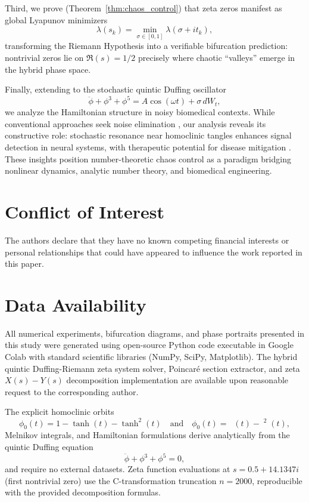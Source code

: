 \documentclass{ws-ijbc}
\DeclareMathOperator{\RZsech}{sech_{RZ}}
\begin{document}
Third, we prove (Theorem~\ref{thm:chaos_control}) that zeta zeros manifest as global Lyapunov minimizers
\[
\lambda(s_k)=\min_{\sigma\in[0,1]}\lambda(\sigma+it_k),
\]
transforming the Riemann Hypothesis into a verifiable bifurcation prediction: nontrivial zeros lie on $\Re(s)=1/2$ precisely where chaotic ``valleys'' emerge in the hybrid phase space.

Finally, extending to the stochastic quintic Duffing oscillator
\[
\ddot{\phi}+\phi^3+\phi^5=A\cos(\omega t)+\sigma\, dW_t,
\]
we analyze the Hamiltonian structure in noisy biomedical contexts. While conventional approaches seek noise elimination \cite{L. Cohen65}, our analysis reveals its constructive role: stochastic resonance near homoclinic tangles enhances signal detection in neural systems, with therapeutic potential for disease mitigation \cite{R. Benzi66}. These insights position number-theoretic chaos control as a paradigm bridging nonlinear dynamics, analytic number theory, and biomedical engineering.

\section{Conflict of Interest}

The authors declare that they have no known competing financial interests or personal relationships that could have appeared to influence the work reported in this paper.

\section{Data Availability}

All numerical experiments, bifurcation diagrams, and phase portraits presented in this study were generated using open-source Python code executable in Google Colab with standard scientific libraries (NumPy, SciPy, Matplotlib). The hybrid quintic Duffing-Riemann zeta system solver, Poincaré section extractor, and zeta $X(s)-Y(s)$ decomposition implementation are available upon reasonable request to the corresponding author. 

The explicit homoclinic orbits 
\[
\phi_0(t)=1-\tanh(t)-\tanh^2(t) \quad \text{and} \quad 
\phi_0(t)=\RZsech(t)-\RZsech^2(t),
\]
Melnikov integrals, and Hamiltonian formulations derive analytically from the quintic Duffing equation 
\[
\ddot{\phi}+\phi^3+\phi^5=0,
\] 
and require no external datasets. Zeta function evaluations at $s=0.5+14.1347i$ (first nontrivial zero) use the C-transformation truncation $n=2000$, reproducible with the provided decomposition formulas.
\end{document}
